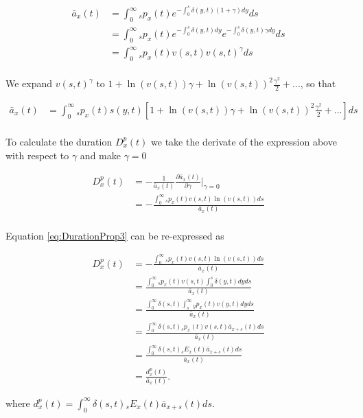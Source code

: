 \documentclass[12pt]{article}
\begin{document}
\begin{equation}\label{eq:DurationProp1}
\begin{split}
\bar{a} _x(t) &= \int_0^\infty {}_sp_x(t) e^{-\int_0^{s}\delta(y,t)(1+\gamma)dy}ds \\
&= \int_0^\infty {}_sp_x(t) e^{-\int_0^{s}\delta(y,t)dy}e^{-\int_0^{s}\delta(y,t)\gamma dy}ds \\
&= \int_0^\infty {}_sp_x(t) v(s,t)v(s,t)^{\gamma}ds \\
\end{split}
\end{equation}


We expand $v(s,t)^{\gamma}$ to $1+\ln(v(s,t)) \gamma+{\ln(v(s,t))}^2 \frac{\gamma^2}{2}+...$, so that


\begin{equation}\label{eq:DurationProp2}
\begin{split}
\bar{a}_x(t) &= \int_0^\infty {}_sp_x(t) s(y,t)[1+\ln(v(s,t)) \gamma+{\ln(v(s,t))}^2 \frac{\gamma^2}{2}+...]ds\\
\end{split}
\end{equation}


To calculate the duration ${D}^{p}_{x}(t)$ we take the derivate of the expression above with respect to $\gamma$ and make $\gamma=0$

\begin{equation}\label{eq:DurationProp3}
\begin{split}
{D}^{p}_{x}(t)&=-\frac{1}{\bar{a}_x(t)}\frac{\partial \bar{a}_x(t)}{\partial \gamma} \bigg\rvert_{\gamma=0} \\
&= -\frac{\int_0^\infty {}_sp_x(t) v(s,t) \ln(v(s,t))ds}{\bar{a}_x(t)} \\
\end{split}
\end{equation}


Equation \ref{eq:DurationProp3} can be re-expressed as 


\begin{equation}\label{eq:DurationProp4}
\begin{split}
{D}^{p}_{x}(t) &= -\frac{\int_0^\infty {}_sp_x(t) v(s,t) \ln(v(s,t))ds}{\bar{a}_x(t)}\\
&= \frac{\int_0^\infty {}_sp_x(t) v(s,t) \int_0^{s} \delta(y,t)dy ds }{\bar{a}_x(t)}\\
&= \frac{\int_0^\infty \delta(s,t)  \int_{s}^{\infty} {}_{y}p_x(t) v(y,t)dy ds }{\bar{a}_x(t)}\\
&= \frac{\int_0^\infty \delta(s,t) {}_sp_x(t) v(s,t) \bar{a}_{x+s}(t)  ds }{\bar{a}_x(t)}\\
&= \frac{\int_0^\infty \delta(s,t) {}_sE_x(t) \bar{a}_{x+s}(t) ds}{\bar{a}_x(t)} \\
&= \frac{{d}^{p}_{x}(t)}{\bar{a}_x(t)}.
\end{split}
\end{equation}



where ${d}^{p}_{x}(t)=\int_0^\infty \delta(s,t) {}_sE_x(t) \bar{a}_{x+s}(t) ds$.
\end{document}
